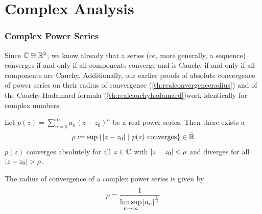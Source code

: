 \part{Complex Analysis}
\section{Complex Power Series}
Since $\mathbb{C} \cong \mathbb{R}^2$, we know already that a series (or, more generally, a sequence) converges if and only if all components converge and is Cauchy if and only if all components are Cauchy. Additionally, our earlier proofs of absolute convergence of power series on their radius of convergence (\ref{th:realconvergenceradius}) and of the Cauchy-Hadamard formula (\ref{th:realcauchyhadamard})work identically for complex numbers.
\begin{corollary}
	Let $p(z) = \sum_{n = 0}^\infty a_n (z - z_0)^n$ be a real power series. Then there exists a 
	\begin{align*}
		\rho := \sup\qty{\abs{z - z_0} ~\middle|~p(z) \textnormal{ converges}} \in \bar {\mathbb{R}}
	\end{align*}
	$p(z)$ converges absolutely for all $z \in \mathbb{C}$ with $\abs{z - z_0} < \rho$ and diverges for all $\abs{z - z_0} > \rho$.
\end{corollary}
\begin{corollary}
	The radius of convergence of a complex power series is given by
	\begin{align*}
		\rho = \frac{1}{\displaystyle \limsup_{n \to \infty} \abs{a_n}^\frac{1}{n}}
	\end{align*}
\end{corollary}